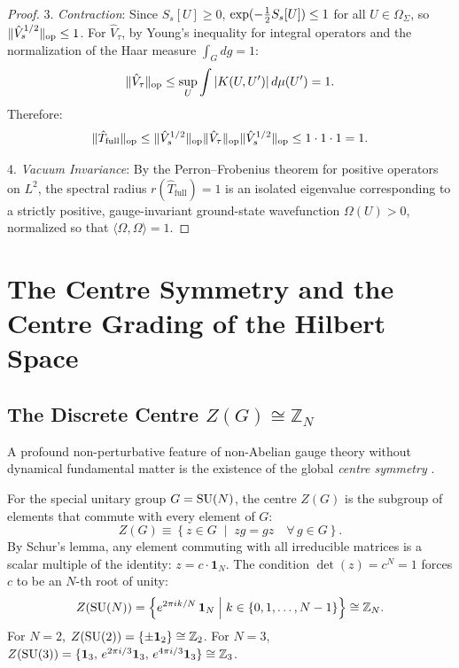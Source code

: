 \begin{proof}
3. \emph{Contraction}: Since $S_s[U] \ge 0$, $\exp(-\tfrac{1}{2} S_s[U]) \le 1$ for all $U \in \Omega_\Sigma$, so $\|\hat{V}_s^{1/2}\|_{\mathrm{op}} \le 1$. For $\hat{V}_\tau$, by Young's inequality for integral operators and the normalization of the Haar measure $\int_G dg = 1$:
\begin{equation}
\|\hat{V}_\tau\|_{\mathrm{op}} \le \sup_U \int |K(U, U')| \, d\mu(U') = 1.
\end{equation}
Therefore:
\begin{equation}
\|\hat{T}_{\mathrm{full}}\|_{\mathrm{op}} \le \|\hat{V}_s^{1/2}\|_{\mathrm{op}} \|\hat{V}_\tau\|_{\mathrm{op}} \|\hat{V}_s^{1/2}\|_{\mathrm{op}} \le 1 \cdot 1 \cdot 1 = 1.
\end{equation}

4. \emph{Vacuum Invariance}: By the Perron--Frobenius theorem for positive operators on $L^2$, the spectral radius $r(\hat{T}_{\mathrm{full}}) = 1$ is an isolated eigenvalue corresponding to a strictly positive, gauge-invariant ground-state wavefunction $\Omega(U) > 0$, normalized so that $\langle \Omega, \Omega \rangle = 1$.
\end{proof}

\section{The Centre Symmetry and the Centre Grading of the Hilbert Space}
\label{sec:centre_grading}

\subsection{The Discrete Centre $Z(G) \cong \mathbb{Z}_N$}
\label{subsec:centre_definition}

A profound non-perturbative feature of non-Abelian gauge theory without dynamical fundamental matter is the existence of the global \emph{centre symmetry} \cite{tHooft1978}. 

For the special unitary group $G = \mathrm{SU}(N)$, the centre $Z(G)$ is the subgroup of elements that commute with every element of $G$:
\begin{equation}
\label{eq:centre_definition}
Z(G) \equiv \left\{ z \in G \;\middle|\; z g = g z \quad \forall \, g \in G \right\}.
\end{equation}
By Schur's lemma, any element commuting with all irreducible matrices is a scalar multiple of the identity: $z = c \cdot \mathbf{1}_N$. The condition $\det(z) = c^N = 1$ forces $c$ to be an $N$-th root of unity:
\begin{equation}
\label{eq:centre_zn_isomorphism}
Z(\mathrm{SU}(N)) = \left\{ e^{2\pi i k / N} \, \mathbf{1}_N \;\middle|\; k \in \{0, 1, \dots, N-1\} \right\} \cong \mathbb{Z}_N.
\end{equation}
For $N = 2$, $Z(\mathrm{SU}(2)) = \{ \pm \mathbf{1}_2 \} \cong \mathbb{Z}_2$. For $N = 3$, $Z(\mathrm{SU}(3)) = \{ \mathbf{1}_3, \, e^{2\pi i / 3} \mathbf{1}_3, \, e^{4\pi i / 3} \mathbf{1}_3 \} \cong \mathbb{Z}_3$.

